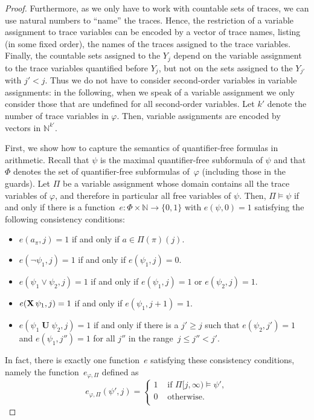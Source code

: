 \documentclass[dvipsnames,10pt,a4paper]{amsart}
\theoremstyle{definition}
\theoremstyle{remark}
\newcommand{\nats}{\mathbb{N}}
\renewcommand{\phi}{\varphi}
\newcommand{\set}[1]{\{#1\}}
\DeclareMathOperator{\U}{\mathbf{U}}
\newcommand{\X}{\mathop{\mathbf{X}\vphantom{a}}\nolimits}
\newcommand{\suffix}[2]{#1[#2,\infty)}
\newcommand{\myquot}[1]{``#1''}
\newcommand{\expansion}{e}
\begin{document}
\begin{proof}
Furthermore, as we only have to work with countable sets of traces, we can use natural numbers to \myquot{name} the traces. Hence, the restriction of a variable assignment to trace variables can be encoded by a vector of trace names, listing (in some fixed order), the names of the traces assigned to the trace variables. 
Finally, the countable sets assigned to the $Y_j$ depend on the variable assignment to the trace variables quantified before $Y_j$, but not on the sets assigned to the $Y_{j'}$ with $j' < j$. Thus we do not have to consider second-order variables in variable assignments: in the following, when we speak of a variable assignment we only consider those that are undefined for all second-order variables. Let $k'$ denote the number of trace variables in $\phi$. Then, variable assignments are encoded by vectors in $\nats^{k'}$.

First, we show how to capture the semantics of quantifier-free formulas in arithmetic.
Recall that $\psi$ is the maximal quantifier-free subformula of $\psi$ and that $\Phi$ denotes the set of quantifier-free subformulas of~$\varphi$ (including those in the guards).
Let $\Pi$ be a variable assignment whose domain contains all the trace variables of $\varphi$, and therefore in particular all free variables of $\psi$.
Then, $\Pi \models \psi$ if and only if there is a function~$\expansion \colon \Phi \times \nats \rightarrow \set{0,1}$ with $\expansion(\psi, 0)=1$ satisfying the following consistency conditions:
\begin{itemize}
	\item $\expansion(a_\pi,j)=1$ if and only if $a \in \Pi(\pi)(j)$.
	\item $\expansion(\neg \psi_1,j)=1$ if and only if  $\expansion(\psi_1,j)=0$.
	\item $\expansion(\psi_1 \vee \psi_2,j)=1$ if and only if $\expansion(\psi_1,j)=1$ or $\expansion(\psi_2,j)=1$.
	\item $\expansion(\X\psi_1,j)=1$ if and only if $\expansion(\psi_1,j+1)=1$.
	\item $\expansion(\psi_1 \U \psi_2,j)=1$ if and only if there is a $j' \ge j$ such that $\expansion(\psi_2,j')=1$ and $\expansion(\psi_1,j'')=1$ for all $j''$ in the range~$j \le j'' < j'$.
\end{itemize}

In fact, there is exactly one function~$\expansion$ satisfying these consistency conditions, namely the function~$\expansion_{\phi,\Pi}$ defined as
\[
\expansion_{\phi,\Pi}(\psi',j) = \begin{cases}
    1 &\text{ if }\suffix{\Pi}{j}\models \psi',\\
    0 &\text{ otherwise.}\\
\end{cases}
\]


\end{proof}
\end{document}
